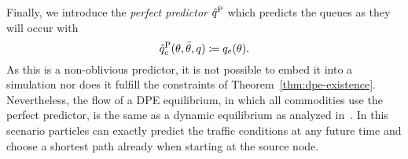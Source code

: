 Finally, we introduce the \emph{perfect predictor} $\hat q^{\text{P}}$ which predicts the queues as they will occur with \[
    \hat q^{\text{P}}_e(\theta,\bar\theta,q) \coloneqq q_e(\theta).
\]
As this is a non-oblivious predictor, it is not possible to embed it into a simulation nor does it fulfill the constraints of Theorem~\ref{thm:dpe-existence}.
Nevertheless, the flow of a DPE equilibrium, in which all commodities use the perfect predictor, is the same as a dynamic equilibrium as analyzed in~\cite[Definition~2]{Cominetti2015}.
In this scenario particles can exactly predict the traffic conditions at any future time and choose a shortest path already when starting at the source node.
